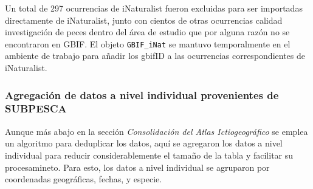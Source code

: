 \documentclass[sn-apa,pdflatex]{sn-jnl}
\newenvironment{Shaded}{\begin{snugshade}}{\end{snugshade}}
\newcommand{\CommentTok}[1]{\textcolor[rgb]{0.56,0.35,0.01}{\textit{#1}}}
\newcommand{\FunctionTok}[1]{\textcolor[rgb]{0.13,0.29,0.53}{\textbf{#1}}}
\newcommand{\NormalTok}[1]{#1}
\newcommand{\OtherTok}[1]{\textcolor[rgb]{0.56,0.35,0.01}{#1}}
\newcommand{\SpecialCharTok}[1]{\textcolor[rgb]{0.81,0.36,0.00}{\textbf{#1}}}
\newcommand{\StringTok}[1]{\textcolor[rgb]{0.31,0.60,0.02}{#1}}
\begin{document}
\begin{Shaded}
\end{Shaded}

Un total de 297 ocurrencias de iNaturalist fueron excluidas para ser
importadas directamente de iNaturalist, junto con cientos de otras
ocurrencias calidad investigación de peces dentro del área de estudio
que por alguna razón no se encontraron en GBIF. El objeto
\texttt{GBIF\_iNat} se mantuvo temporalmente en el ambiente de trabajo
para añadir los gbifID a las ocurrencias correspondientes de
iNaturalist.

\subsubsection{Agregación de datos a nivel individual provenientes de
SUBPESCA}\label{agregaciuxf3n-de-datos-a-nivel-individual-provenientes-de-subpesca}

Aunque más abajo en la sección \emph{Consolidación del Atlas
Ictiogeográfico} se emplea un algoritmo para deduplicar los datos, aquí
se agregaron los datos a nivel individual para reducir considerablemente
el tamaño de la tabla y facilitar su procesamineto. Para esto, los datos
a nivel individual se agruparon por coordenadas geográficas, fechas, y
especie.
\end{document}
